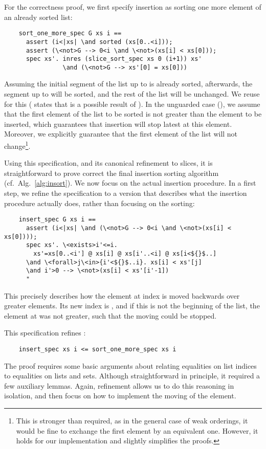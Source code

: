 \documentclass[sigplan,10pt,anonymous,review]{acmart}\settopmatter{printfolios=true,printccs=false,printacmref=false}
\theoremstyle{definition}
\begin{document}
  For the correctness proof, we first specify insertion as sorting one more element of an already sorted list:
  \begin{lstlisting}
    sort_one_more_spec G xs i ==
      assert (i<|xs| \and sorted (xs[0..<i]));
      assert (\<not>G --> 0<i \and \<not>(xs[i] < xs[0]));
      spec xs'. inres (slice_sort_spec xs 0 (i+1)) xs'
                \and (\<not>G --> xs'[0] = xs[0]))
  \end{lstlisting}
  Assuming the initial segment of the list up to  is already sorted,
  afterwards, the segment up to  will be sorted, and the rest of the list
  will be unchanged. We reuse  for this ( states that  is a possible result of ).
  In the unguarded case (), we assume that the first element of the list to be sorted is not greater than
  the element to be inserted, which guarantees that insertion will stop latest at this element. Moreover, we explicitly guarantee
  that the first element of the list will not change\footnote{This is stronger than required, as in the general case of weak orderings,
  it would be fine to exchange the first element by an equivalent one. However, it holds for our implementation and slightly simplifies the proofs.}.

  Using this specification, and its canonical refinement to slices, it is straightforward to prove correct the final
  insertion sorting algorithm (cf.~Alg.~\ref{alg:insort}). We now focus on the actual insertion procedure.
  In a first step, we refine the specification to a version that describes what the insertion procedure actually does,
  rather than focusing on the sorting:
  \begin{lstlisting}
    insert_spec G xs i ==
      assert (i<|xs| \and (\<not>G --> 0<i \and \<not>(xs[i] < xs[0])));
      spec xs'. \<exists>i'<=i.
        xs'=xs[0..<i'] @ xs[i] @ xs[i'..<i] @ xs[i<${}$..]
      \and \<forall>j\<in>{i'<${}$..i}. xs[i] < xs'[j]
      \and i'>0 --> \<not>(xs[i] < xs'[i'-1])
      "
  \end{lstlisting}
  This precisely describes how the element at index  is moved backwards over greater elements.
  Its new index is , and if this is not the beginning of the list, the element at  was not greater,
  such that the moving could be stopped.

  This specification refines :
  \begin{theorem}
  \begin{lstlisting}
    insert_spec xs i <= sort_one_more_spec xs i
  \end{lstlisting}
  \end{theorem}
  The proof requires some basic arguments about relating equalities on list indices to equalities on lists and sets.
  Although straightforward in principle, it required a few auxiliary lemmas.
  Again, refinement allows us to do this reasoning in isolation, and then focus on how to implement the moving
  of the element.
\end{document}

